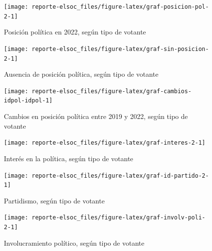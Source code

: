 \documentclass[
  12pt,
]{book}
\begin{document}
\begin{figure}

{\centering \texttt{[image: reporte-elsoc\_files/figure-latex/graf-posicion-pol-2-1]} 

}

\caption{Posición política en 2022, según tipo de votante}\label{fig:graf-posicion-pol-2}
\end{figure}

\begin{figure}

{\centering \texttt{[image: reporte-elsoc\_files/figure-latex/graf-sin-posicion-2-1]} 

}

\caption{Ausencia de posición política, según tipo de votante}\label{fig:graf-sin-posicion-2}
\end{figure}

\begin{figure}

{\centering \texttt{[image: reporte-elsoc\_files/figure-latex/graf-cambios-idpol-idpol-1]} 

}

\caption{Cambios en posición política entre 2019 y 2022, según tipo de votante}\label{fig:graf-cambios-idpol-idpol}
\end{figure}

\begin{figure}

{\centering \texttt{[image: reporte-elsoc\_files/figure-latex/graf-interes-2-1]} 

}

\caption{Interés en la política, según tipo de votante}\label{fig:graf-interes-2}
\end{figure}

\begin{figure}

{\centering \texttt{[image: reporte-elsoc\_files/figure-latex/graf-id-partido-2-1]} 

}

\caption{Partidismo, según tipo de votante}\label{fig:graf-id-partido-2}
\end{figure}

\begin{figure}

{\centering \texttt{[image: reporte-elsoc\_files/figure-latex/graf-involv-poli-2-1]} 

}

\caption{Involucramiento político, según tipo de votante}\label{fig:graf-involv-poli-2}
\end{figure}
\end{document}
